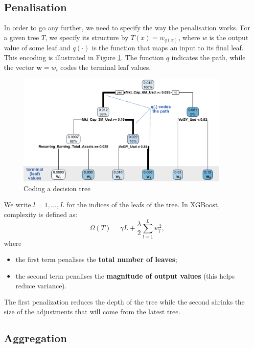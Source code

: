 \documentclass[]{krantz}
\providecommand{\tightlist}{%
  \setlength{\itemsep}{0pt}\setlength{\parskip}{0pt}}
\theoremstyle{definition}
\theoremstyle{definition}
\theoremstyle{definition}
\theoremstyle{remark}
\begin{document}
\hypertarget{penalisation}{%
\subsection{Penalisation}\label{penalisation}}

In order to go any further, we need to specify the way the penalisation
works. For a given tree \(T\), we specify its structure by
\(T(x)=w_{q(x)}\), where \(w\) is the output value of some leaf and
\(q(\cdot)\) is the function that maps an input to its final leaf. This
encoding is illustrated in Figure \ref{fig:treeq}. The function \(q\)
indicates the path, while the vector \(\textbf{w}=w_i\) codes the
terminal leaf values.

\begin{figure}[H]

{\centering \includegraphics[width=400px]{images/tree_q} 

}

\caption{Coding a decision tree}\label{fig:treeq}
\end{figure}

We write \(l=1,\dots,L\) for the indices of the leafs of the tree. In
XGBoost, complexity is defined as:
\[\Omega(T)=\gamma L+\frac{\lambda}{2}\sum_{l=1}^Lw_l^2,\] where

\begin{itemize}
\tightlist
\item
  the first term penalises the \textbf{total number of leaves};\\
\item
  the second term penalises the \textbf{magnitude of output values}
  (this helps reduce variance).
\end{itemize}

The first penalization reduces the depth of the tree while the second
shrinks the size of the adjustments that will come from the latest tree.

\hypertarget{aggregation}{%
\subsection{Aggregation}\label{aggregation}}
\end{document}

